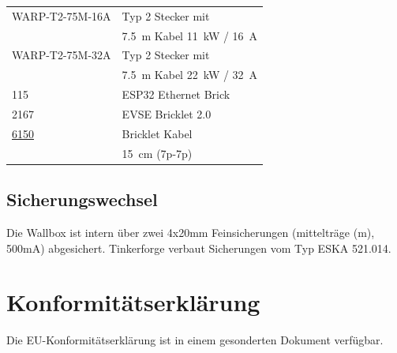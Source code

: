 \documentclass[a4paper,10pt]{article}
\begin{document}
\begin{multicols*}{2}
\begin{tabular}{ll}
		\cmidrule(lr{0.5em}){1-2}
		WARP-T2-75M-16A                                                                                                          & Typ 2 Stecker mit                                             \\
		                                                                                                                         & \SI{7,5}{\meter} Kabel \SI{11}{\kilo\watt} / \SI{16}{\ampere} \\
		\cmidrule(lr{0.5em}){1-2}
		WARP-T2-75M-32A                                                                                                          & Typ 2 Stecker mit                                             \\
		                                                                                                                         & \SI{7,5}{\meter} Kabel \SI{22}{\kilo\watt} / \SI{32}{\ampere} \\
		\cmidrule(lr{0.5em}){1-2}
		115																														 & ESP32 Ethernet Brick                                                   \\
		\cmidrule(lr{0.5em}){1-2}
		2167																													 & EVSE Bricklet                                                 2.0 \\
		\cmidrule(lr{0.5em}){1-2}
		\href{https://www.tinkerforge.com/de/shop/accessories/cable/bricklet-cable-15cm-7p-7p.html}{6150}                        & Bricklet Kabel                                                \\
		                                                                                                                         & \SI{15}{\centi\meter} (7p-7p)                                 \\
	\end{tabular}

	\subsection{Sicherungswechsel}
	Die Wallbox ist intern über zwei 4x20mm Feinsicherungen (mittelträge (m), 500mA) abgesichert.
	Tinkerforge verbaut Sicherungen vom Typ \glqq ESKA 521.014\grqq.

	\vfill
	\section{Konformitätserklärung}
	Die EU-Konformitätserklärung ist in einem gesonderten Dokument verfügbar.


\end{multicols*}
\end{document}

